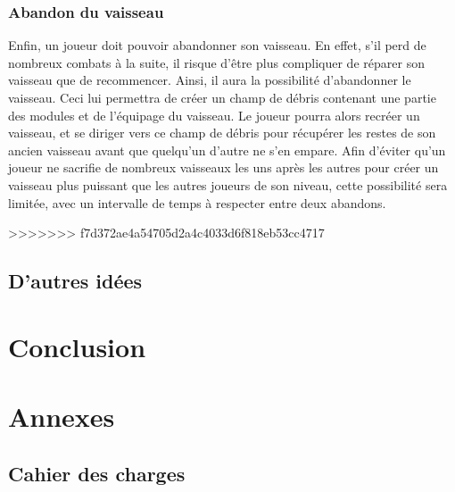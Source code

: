 \documentclass[a4paper,11pt]{report}
\begin{document}
    
    \subsection{Abandon du vaisseau}
      Enfin, un joueur doit pouvoir abandonner son vaisseau. 
      En effet, s'il perd de nombreux combats à la suite, il risque d'être plus compliquer de réparer son vaisseau que de recommencer.
      Ainsi, il aura la possibilité d'abandonner le vaisseau. Ceci lui permettra de créer un champ de débris contenant une partie des modules et de l'équipage du vaisseau.
      Le joueur pourra alors recréer un vaisseau, et se diriger vers ce champ de débris pour récupérer les restes de son ancien vaisseau avant que quelqu'un d'autre ne s'en empare.
      Afin d'éviter qu'un joueur ne sacrifie de nombreux vaisseaux les uns après les autres pour créer un vaisseau plus puissant que les autres joueurs de son niveau, cette possibilité sera limitée, avec un intervalle de temps à respecter entre deux abandons.
      
>>>>>>> f7d372ae4a54705d2a4c4033d6f818eb53cc4717
  \section{D'autres idées}
\chapter{Conclusion}
\chapter{Annexes}
  \section{Cahier des charges}
    
\end{document}

